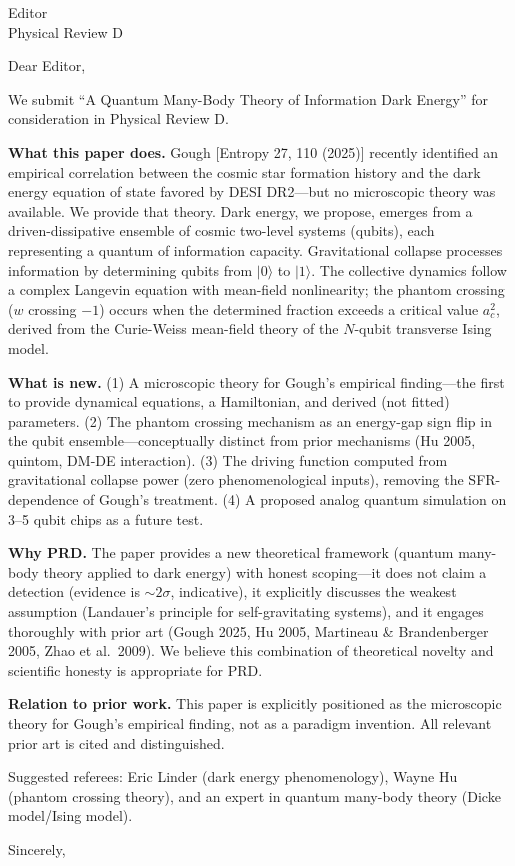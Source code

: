 \documentclass[12pt]{letter}
\begin{document}
\begin{letter}{Editor\\Physical Review D}

\opening{Dear Editor,}

We submit ``A Quantum Many-Body Theory of Information Dark Energy'' for consideration in Physical Review D.

\textbf{What this paper does.} Gough [Entropy 27, 110 (2025)] recently identified an empirical correlation between the cosmic star formation history and the dark energy equation of state favored by DESI DR2---but no microscopic theory was available. We provide that theory. Dark energy, we propose, emerges from a driven-dissipative ensemble of cosmic two-level systems (qubits), each representing a quantum of information capacity. Gravitational collapse processes information by determining qubits from $|0\rangle$ to $|1\rangle$. The collective dynamics follow a complex Langevin equation with mean-field nonlinearity; the phantom crossing ($w$ crossing $-1$) occurs when the determined fraction exceeds a critical value $a_c^2$, derived from the Curie-Weiss mean-field theory of the $N$-qubit transverse Ising model.

\textbf{What is new.} (1) A microscopic theory for Gough's empirical finding---the first to provide dynamical equations, a Hamiltonian, and derived (not fitted) parameters. (2) The phantom crossing mechanism as an energy-gap sign flip in the qubit ensemble---conceptually distinct from prior mechanisms (Hu 2005, quintom, DM-DE interaction). (3) The driving function computed from gravitational collapse power (zero phenomenological inputs), removing the SFR-dependence of Gough's treatment. (4) A proposed analog quantum simulation on 3--5 qubit chips as a future test.

\textbf{Why PRD.} The paper provides a new theoretical framework (quantum many-body theory applied to dark energy) with honest scoping---it does not claim a detection (evidence is $\sim 2\sigma$, indicative), it explicitly discusses the weakest assumption (Landauer's principle for self-gravitating systems), and it engages thoroughly with prior art (Gough 2025, Hu 2005, Martineau \& Brandenberger 2005, Zhao et al.\ 2009). We believe this combination of theoretical novelty and scientific honesty is appropriate for PRD.

\textbf{Relation to prior work.} This paper is explicitly positioned as the microscopic theory for Gough's empirical finding, not as a paradigm invention. All relevant prior art is cited and distinguished.

Suggested referees: Eric Linder (dark energy phenomenology), Wayne Hu (phantom crossing theory), and an expert in quantum many-body theory (Dicke model/Ising model).

\closing{Sincerely,}

\end{letter}
\end{document}

